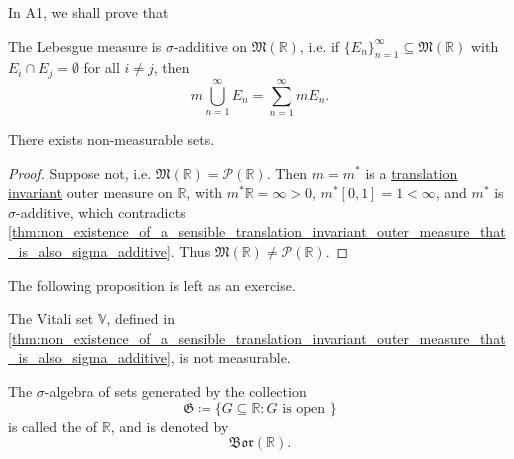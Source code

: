 \documentclass[notoc,notitlepage]{tufte-book}
\newcommand{\Bor}{\mathfrak{Bor}}
\begin{document}
In A1, we shall prove that

\begin{thm}\label{thm:_sigma_additivity_of_the_lebesgue_measure_on_lebesgue_measurable_sets}
  The Lebesgue measure is $\sigma$-additive on $\mathfrak{M}(\mathbb{R})$, i.e.
  if $\{ E_n \}_{n=1}^{\infty} \subseteq \mathfrak{M}(\mathbb{R})$ with $E_i
  \cap E_j = \emptyset$ for all $i \neq j$, then
  \begin{equation*}
    m \bigcup_{n=1}^{\infty} E_n = \sum_{n=1}^{\infty} m E_n.
  \end{equation*}
\end{thm}

\begin{crly}\label{crly:existence_of_non_measurable_sets}
  There exists non-measurable sets.
\end{crly}

\begin{proof}
  Suppose not, i.e. $\mathfrak{M}(\mathbb{R}) =
  \mathcal{P}(\mathbb{R})$. Then $m = m^*$ is a
  \hyperref[defn:translation_invariant]{translation invariant} outer measure on
  $\mathbb{R}$, with $m^* \mathbb{R} = \infty > 0$, $m^* [0, 1] = 1 < \infty$,
  and $m^*$ is $\sigma$-additive, which contradicts
  \cref{thm:non_existence_of_a_sensible_translation_invariant_outer_measure_that_is_also_sigma_additive}.
  Thus $\mathfrak{M}(\mathbb{R}) \neq \mathcal{P}(\mathbb{R})$.
\end{proof}

The following proposition is left as an exercise.

\begin{propo}\label{propo:non_measurability_of_the_vitali_set}
  The Vitali set $\mathbb{V}$, defined in
  \cref{thm:non_existence_of_a_sensible_translation_invariant_outer_measure_that_is_also_sigma_additive},
  is not measurable.
\end{propo}


\begin{defn}\label{defn:_sigma_algebra_of_borel_sets}
  The $\sigma$-algebra of sets generated by the collection
  \begin{equation*}
    \mathfrak{G} \coloneqq \{ G \subseteq \mathbb{R} : G \text{ is open } \}
  \end{equation*}
  is called the  of $\mathbb{R}$, and is
  denoted by
  \begin{equation*}
    \Bor(\mathbb{R}).
  \end{equation*}
\end{defn}
\end{document}

